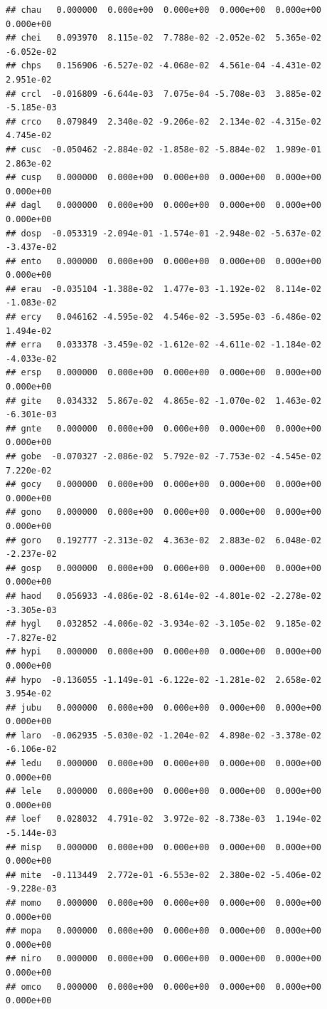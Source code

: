 \documentclass[
]{article}
\begin{document}
\begin{verbatim}
## chau   0.000000  0.000e+00  0.000e+00  0.000e+00  0.000e+00  0.000e+00
## chei   0.093970  8.115e-02  7.788e-02 -2.052e-02  5.365e-02 -6.052e-02
## chps   0.156906 -6.527e-02 -4.068e-02  4.561e-04 -4.431e-02  2.951e-02
## crcl  -0.016809 -6.644e-03  7.075e-04 -5.708e-03  3.885e-02 -5.185e-03
## crco   0.079849  2.340e-02 -9.206e-02  2.134e-02 -4.315e-02  4.745e-02
## cusc  -0.050462 -2.884e-02 -1.858e-02 -5.884e-02  1.989e-01  2.863e-02
## cusp   0.000000  0.000e+00  0.000e+00  0.000e+00  0.000e+00  0.000e+00
## dagl   0.000000  0.000e+00  0.000e+00  0.000e+00  0.000e+00  0.000e+00
## dosp  -0.053319 -2.094e-01 -1.574e-01 -2.948e-02 -5.637e-02 -3.437e-02
## ento   0.000000  0.000e+00  0.000e+00  0.000e+00  0.000e+00  0.000e+00
## erau  -0.035104 -1.388e-02  1.477e-03 -1.192e-02  8.114e-02 -1.083e-02
## ercy   0.046162 -4.595e-02  4.546e-02 -3.595e-03 -6.486e-02  1.494e-02
## erra   0.033378 -3.459e-02 -1.612e-02 -4.611e-02 -1.184e-02 -4.033e-02
## ersp   0.000000  0.000e+00  0.000e+00  0.000e+00  0.000e+00  0.000e+00
## gite   0.034332  5.867e-02  4.865e-02 -1.070e-02  1.463e-02 -6.301e-03
## gnte   0.000000  0.000e+00  0.000e+00  0.000e+00  0.000e+00  0.000e+00
## gobe  -0.070327 -2.086e-02  5.792e-02 -7.753e-02 -4.545e-02  7.220e-02
## gocy   0.000000  0.000e+00  0.000e+00  0.000e+00  0.000e+00  0.000e+00
## gono   0.000000  0.000e+00  0.000e+00  0.000e+00  0.000e+00  0.000e+00
## goro   0.192777 -2.313e-02  4.363e-02  2.883e-02  6.048e-02 -2.237e-02
## gosp   0.000000  0.000e+00  0.000e+00  0.000e+00  0.000e+00  0.000e+00
## haod   0.056933 -4.086e-02 -8.614e-02 -4.801e-02 -2.278e-02 -3.305e-03
## hygl   0.032852 -4.006e-02 -3.934e-02 -3.105e-02  9.185e-02 -7.827e-02
## hypi   0.000000  0.000e+00  0.000e+00  0.000e+00  0.000e+00  0.000e+00
## hypo  -0.136055 -1.149e-01 -6.122e-02 -1.281e-02  2.658e-02  3.954e-02
## jubu   0.000000  0.000e+00  0.000e+00  0.000e+00  0.000e+00  0.000e+00
## laro  -0.062935 -5.030e-02 -1.204e-02  4.898e-02 -3.378e-02 -6.106e-02
## ledu   0.000000  0.000e+00  0.000e+00  0.000e+00  0.000e+00  0.000e+00
## lele   0.000000  0.000e+00  0.000e+00  0.000e+00  0.000e+00  0.000e+00
## loef   0.028032  4.791e-02  3.972e-02 -8.738e-03  1.194e-02 -5.144e-03
## misp   0.000000  0.000e+00  0.000e+00  0.000e+00  0.000e+00  0.000e+00
## mite  -0.113449  2.772e-01 -6.553e-02  2.380e-02 -5.406e-02 -9.228e-03
## momo   0.000000  0.000e+00  0.000e+00  0.000e+00  0.000e+00  0.000e+00
## mopa   0.000000  0.000e+00  0.000e+00  0.000e+00  0.000e+00  0.000e+00
## niro   0.000000  0.000e+00  0.000e+00  0.000e+00  0.000e+00  0.000e+00
## omco   0.000000  0.000e+00  0.000e+00  0.000e+00  0.000e+00  0.000e+00

\end{verbatim}
\end{document}
